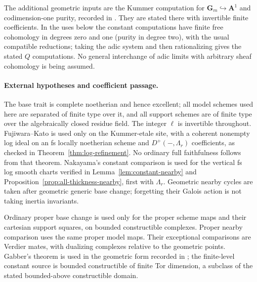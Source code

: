 \documentclass[11pt]{article}
\theoremstyle{definition}
\theoremstyle{remark}
\begin{document}
The additional geometric inputs are the Kummer computation for
$\mathbf G_m\hookrightarrow\mathbf A^1$ and codimension-one purity,
recorded in \cite[\S6.4, Theorems 7.1--7.2]{IllusieOverview}.  They are
stated there with invertible finite coefficients.  In the uses below
the constant computations have finite free cohomology in degrees zero
and one (purity in degree two), with the usual compatible reductions;
taking the adic system and then rationalizing gives the stated $Q$
computations.  No general interchange of adic limits with arbitrary
sheaf cohomology is being assumed.

\paragraph{External hypotheses and coefficient passage.}
The base trait is complete noetherian and hence excellent; all model
schemes used here are separated of finite type over it, and all
support schemes are of finite type over the algebraically closed
residue field.  The integer $\ell$ is invertible throughout.
Fujiwara--Kato is used only on the Kummer-etale site, with a coherent
nonempty log ideal on an fs locally noetherian scheme and
$D^+(-,\Lambda_r)$ coefficients, as checked in
Theorem~\ref{thm:log-refinement}.  No ordinary full faithfulness follows
from that theorem.  Nakayama's constant comparison is used for the
vertical fs log smooth charts verified in
Lemma~\ref{lem:constant-nearby} and
Proposition~\ref{prop:all-thickness-nearby}, first with $\Lambda_r$.
Geometric nearby cycles are taken after geometric generic base change;
forgetting their Galois action is not taking inertia invariants.

Ordinary proper base change is used only for the proper scheme maps
and their cartesian support squares, on bounded constructible
complexes.  Proper nearby comparison uses the same proper model maps.
Their exceptional comparisons are Verdier mates, with dualizing
complexes relative to the geometric points.  Gabber's theorem is
used in the geometric form recorded in
\cite[Corollary 3.2, Remark 3.3]{LuZhengNearby}; the finite-level
constant source is bounded constructible of finite Tor dimension,
a subclass of the stated bounded-above constructible domain.
\end{document}
